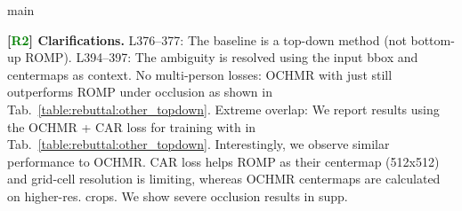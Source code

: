 main\documentclass[10pt,twocolumn,letterpaper]{article}
\newcommand{\Rtwo}{\textcolor{Green}{R2}}
\begin{document}
\vspace{1.0mm}\noindent
\textbf{[\Rtwo] Clarifications.} L376--377: The baseline is a top-down method (not bottom-up ROMP). L394--397: The ambiguity is resolved using the input bbox and centermaps as context. No multi-person losses: OCHMR with just  still outperforms ROMP under occlusion as shown in Tab.~\ref{table:rebuttal:other_topdown}. Extreme overlap: We report results using the OCHMR + CAR loss for training  with  in Tab.~\ref{table:rebuttal:other_topdown}. Interestingly, we observe similar performance to OCHMR. CAR loss helps ROMP as their centermap (512x512) and grid-cell resolution is limiting, whereas OCHMR centermaps are calculated on higher-res. crops. We show severe occlusion results in supp. 


\begin{table}[t]
\captionsetup{font=scriptsize}
\begin{center}
\vspace*{-0.1in}
\vspace*{-0.1in}
\caption{OCHMR with top-down methods and losses. Metrics are MPJPE/AP.}
 \vspace*{-0.4in}
\label{table:rebuttal:other_topdown}
\end{center}
\end{table}
 
\end{document}
